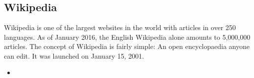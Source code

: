 \subsection{Wikipedia}
Wikipedia is one of the largest websites in the world with articles in over 250 languages. As of January 2016, the English Wikipedia alone amounts to 5,000,000 articles. 
The concept of Wikipedia is fairly simple: An open encyclopaedia anyone can edit. It was launched on January 15, 2001. 

\begin{itemize}
\item
\end{itemize}

